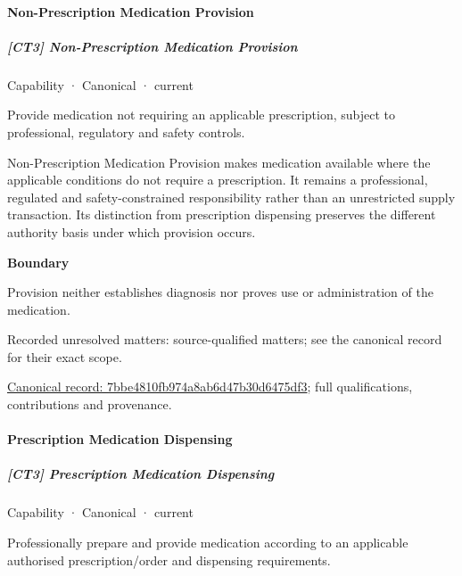 \paragraph{Non-Prescription Medication Provision}

\subparagraph{[CT3] Non-Prescription Medication Provision}

\label{element:7bbe4810fb974a8ab6d47b30d6475df3}
{\small Capability · Canonical · current}\par

Provide medication not requiring an applicable prescription, subject to professional, regulatory and safety controls.



Non-Prescription Medication Provision makes medication available where the applicable conditions do not require a prescription. It remains a professional, regulated and safety-constrained responsibility rather than an unrestricted supply transaction. Its distinction from prescription dispensing preserves the different authority basis under which provision occurs.



\textbf{Boundary}



Provision neither establishes diagnosis nor proves use or administration of the medication.


{\small Recorded unresolved matters: source-qualified matters; see the canonical record for their exact scope.}\par
{\footnotesize \href{../../../../continuum/strategy/capability/7bbe4810fb974a8ab6d47b30d6475df3.md}{Canonical record: 7bbe4810fb974a8ab6d47b30d6475df3}; full qualifications, contributions and provenance.}\par
\paragraph{Prescription Medication Dispensing}

\subparagraph{[CT3] Prescription Medication Dispensing}

\label{element:fef5b79eea77438d9d453a7daef744fc}
{\small Capability · Canonical · current}\par

Professionally prepare and provide medication according to an applicable authorised prescription/order and dispensing requirements.



